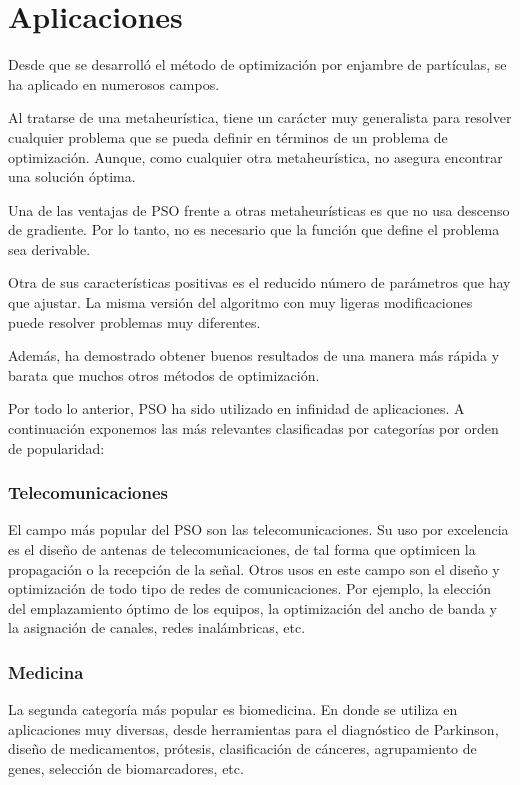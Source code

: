 \documentclass[a4paper,12pt,titlepage]{article}
\begin{document}
\section{Aplicaciones}

Desde que se desarrolló el método de optimización por enjambre de partículas, se ha aplicado en numerosos campos. 

Al tratarse de una metaheurística, tiene un carácter muy generalista para resolver cualquier problema que se pueda definir en términos de un problema de optimización. Aunque, como cualquier otra metaheurística, no asegura encontrar una solución óptima. 

Una de las ventajas de PSO frente a otras metaheurísticas es que no usa descenso de gradiente. Por lo tanto, no es necesario que la función que define el problema sea derivable.

Otra de sus características positivas es el reducido número de parámetros que hay que ajustar. La misma versión del algoritmo con muy ligeras modificaciones puede resolver problemas muy diferentes.

Además, ha demostrado obtener buenos resultados de una manera más rápida y barata que muchos otros métodos de optimización.

Por todo lo anterior, PSO ha sido utilizado en infinidad de aplicaciones. A continuación exponemos las más relevantes clasificadas por categorías por orden de popularidad: \citep{Poli2008,Zhang2015}

\subsubsection{Telecomunicaciones}

El campo más popular del PSO son las telecomunicaciones. Su uso por excelencia es el diseño de antenas de telecomunicaciones, de tal forma que optimicen la propagación o la recepción de la señal. Otros usos en este campo son el diseño y optimización de todo tipo de redes de comunicaciones. Por ejemplo, la elección del emplazamiento óptimo de los equipos, la optimización del ancho de banda y la asignación de canales, redes inalámbricas, etc.

\subsubsection{Medicina}

La segunda categoría más popular es biomedicina. En donde se utiliza en aplicaciones muy diversas, desde herramientas para el diagnóstico de Parkinson, diseño de medicamentos, prótesis, clasificación de cánceres, agrupamiento de genes, selección de biomarcadores, etc.
\end{document}
